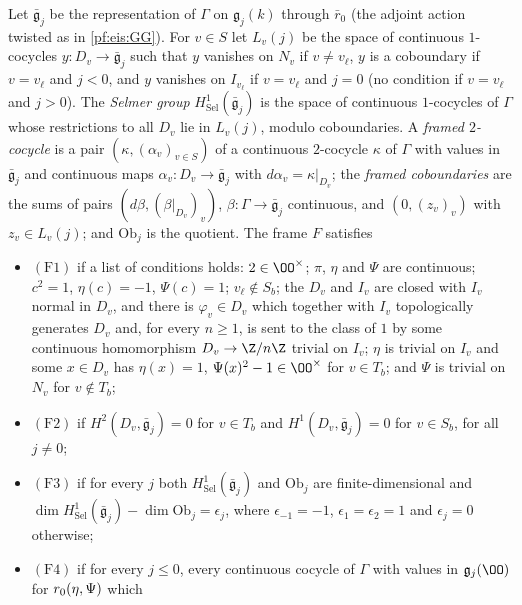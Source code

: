\begin{definition}\label{pf:eis:framecond}
Let $\bar{\mathfrak g}_j$ be the representation of $\Gamma$ on $\mathfrak g_j(k)$ through $\bar r_0$ (the adjoint action twisted as in
\cref{pf:eis:GG}). For $v\in S$ let $L_v(j)$ be the space of continuous $1$-cocycles $y:D_v\to\bar{\mathfrak g}_j$ such that $y$ vanishes on
$N_v$ if $v\ne v_\ell$, $y$ is a coboundary if $v=v_\ell$ and $j<0$, and $y$ vanishes on $I_{v_\ell}$ if $v=v_\ell$ and $j=0$ (no condition if
$v=v_\ell$ and $j>0$). The \emph{Selmer group} $H^1_{\mathrm{Sel}}(\bar{\mathfrak g}_j)$ is the space of continuous $1$-cocycles of $\Gamma$ whose
restrictions to all $D_v$ lie in $L_v(j)$, modulo coboundaries. A \emph{framed $2$-cocycle} is a pair $(\kappa,(\alpha_v)_{v\in S})$ of a
continuous $2$-cocycle $\kappa$ of $\Gamma$ with values in $\bar{\mathfrak g}_j$ and continuous maps $\alpha_v:D_v\to\bar{\mathfrak g}_j$ with
$d\alpha_v=\kappa|_{D_v}$; the \emph{framed coboundaries} are the sums of pairs $(d\beta,(\beta|_{D_v})_v)$, $\beta:\Gamma\to\bar{\mathfrak g}_j$
continuous, and $(0,(z_v)_v)$ with $z_v\in L_v(j)$; and $\mathrm{Ob}_j$ is the quotient. The frame $F$ satisfies
\begin{itemize}
\item $(\mathrm{F1})$ if a list of conditions holds: $2\in\OO^\times$; $\pi$, $\eta$ and $\Psi$ are continuous; $c^2=1$, $\eta(c)=-1$, $\Psi(c)=1$;
  $v_\ell\notin S_b$; the $D_v$ and $I_v$ are closed with $I_v$ normal in $D_v$, and there is $\varphi_v\in D_v$ which together with $I_v$
  topologically generates $D_v$ and, for every $n\ge1$, is sent to the class of $1$ by some continuous homomorphism $D_v\to\Z/n\Z$
  trivial on $I_v$; $\eta$ is trivial on $I_v$ and some $x\in D_v$ has $\eta(x)=1$, $\Psi(x)^2-1\in\OO^\times$ for $v\in T_b$; and $\Psi$
  is trivial on $N_v$ for $v\notin T_b$;
\item $(\mathrm{F2})$ if $H^2(D_v,\bar{\mathfrak g}_j)=0$ for $v\in T_b$ and $H^1(D_v,\bar{\mathfrak g}_j)=0$ for $v\in S_b$, for all $j\ne0$;
\item $(\mathrm{F3})$ if for every $j$ both $H^1_{\mathrm{Sel}}(\bar{\mathfrak g}_j)$ and $\mathrm{Ob}_j$ are finite-dimensional and
  $\dim H^1_{\mathrm{Sel}}(\bar{\mathfrak g}_j)-\dim\mathrm{Ob}_j=\epsilon_j$, where $\epsilon_{-1}=-1$, $\epsilon_1=\epsilon_2=1$ and $\epsilon_j=0$
  otherwise;
\item $(\mathrm{F4})$ if for every $j\le0$, every continuous cocycle of $\Gamma$ with values in $\mathfrak g_j(\OO)$ for $r_0(\eta,\Psi)$ which

\end{itemize}
\end{definition}
